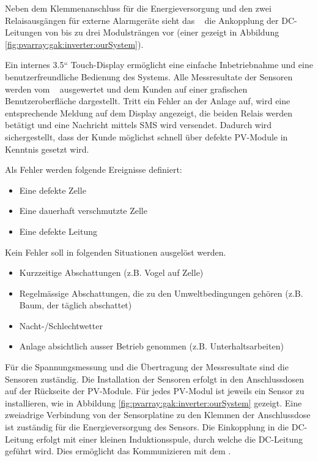 Neben  dem   Klemmenanschluss  f\"ur   die  Energieversorgung  und   den  zwei
Relaisausg\"angen  f\"ur   externe  Alarmger\"ate   sieht  das   \Master~  die
Ankopplung der DC-Leitungen von bis zu drei Modulstr\"angen vor (einer gezeigt
in Abbildung \ref{fig:pvarray:gak:inverter:ourSystem}).

Ein internes  3.5“ Touch-Display  erm\"oglicht eine  einfache Inbetriebnahme
und  eine benutzerfreundliche  Bedienung des  Systems. Alle Messresultate  der
Sensoren werden vom  \Master~ ausgewertet und dem Kunden  auf einer grafischen
Benutzeroberfl\"ache  dargestellt. Tritt ein  Fehler an  der Anlage  auf, wird
eine entsprechende Meldung auf dem Display angezeigt, die beiden Relais werden
bet\"atigt  und  eine  Nachricht  mittels  SMS  wird  versendet. Dadurch  wird
sichergestellt, dass der Kunde m\"oglichst schnell \"uber defekte PV-Module in
Kenntnis gesetzt wird.

\clearpage
Als Fehler werden folgende Ereignisse definiert:
\begin{itemize}
    \tightlist
    \item
        Eine defekte Zelle
    \item
        Eine dauerhaft verschmutzte Zelle
    \item
        Eine defekte Leitung
\end{itemize}

Kein Fehler soll in folgenden Situationen ausgel\"ost werden.
\begin{itemize}
    \tightlist
    \item
        Kurzzeitige Abschattungen (z.B. Vogel auf Zelle)
    \item
        Regelm\"assige Abschattungen,  die zu den  Umweltbedingungen geh\"oren
        (z.B. Baum, der t\"aglich abschattet)
    \item
        Nacht-/Schlechtwetter
    \item
        Anlage absichtlich ausser Betrieb genommen (z.B. Unterhaltsarbeiten)
\end{itemize}

F\"ur   die  Spannungsmessung   und   die   \"Ubertragung  der   Messresultate
sind  die   Sensoren  zust\"andig. Die   Installation  der   Sensoren  erfolgt
in  den   Anschlussdosen  auf  der  R\"uckseite   der  PV-Module. F\"ur  jedes
PV-Modul  ist   jeweils  ein   Sensor  zu   installieren,  wie   in  Abbildung
\ref{fig:pvarray:gak:inverter:ourSystem}  gezeigt. Eine zweiadrige  Verbindung
von der Sensorplatine  zu den Klemmen der Anschlussdose  ist zust\"andig f\"ur
die Energieversorgung  des Sensors. Die Einkopplung in  die DC-Leitung erfolgt
mit  einer  kleinen Induktionsspule,  durch  welche  die DC-Leitung  gef\"uhrt
wird. Dies erm\"oglicht das Kommunizieren mit dem \Master.


